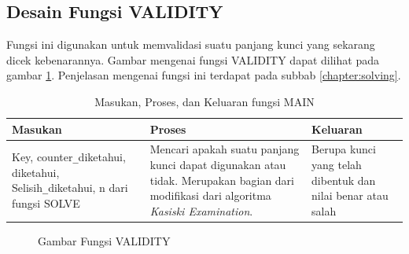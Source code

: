	\subsection{Desain Fungsi VALIDITY}
	Fungsi ini digunakan untuk memvalidasi suatu panjang kunci yang sekarang dicek kebenarannya. Gambar mengenai fungsi VALIDITY dapat dilihat pada gambar \ref{fig:validity}. Penjelasan mengenai fungsi ini terdapat pada subbab \ref{chapter:solving}. %
	
		\begin{table}[H]
	 	\caption{Masukan, Proses, dan Keluaran fungsi MAIN}
		\begin{tabular}   {|p{3cm}|p{4cm}|p{2cm}|}\hline
		Masukan&Proses&Keluaran \\ \hline
		Key, counter\verb|_|diketahui, diketahui, Selisih\verb|_|diketahui, n dari fungsi SOLVE&Mencari apakah suatu panjang kunci dapat digunakan atau tidak. Merupakan bagian dari modifikasi dari algoritma \textit{Kasiski Examination}. &Berupa kunci yang telah dibentuk dan nilai benar atau salah\\ \hline
		\end{tabular}%
		\label{tab:iomain}
	\end{table}
	
 \begin{figure}[H]
		\centering
		\caption{Gambar Fungsi VALIDITY}
		\label{fig:validity}
	\end{figure}
	
